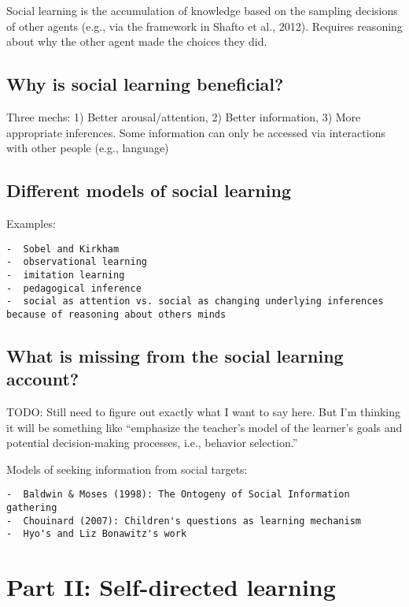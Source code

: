 \documentclass[a4paper,man,apacite,floatsintext]{apa6}
\begin{document}
Social learning is the accumulation of knowledge based on the sampling
decisions of other agents (e.g., via the framework in Shafto et al.,
2012). Requires reasoning about why the other agent made the choices
they did.

\subsection{Why is social learning
beneficial?}\label{why-is-social-learning-beneficial}

Three mechs: 1) Better arousal/attention, 2) Better information, 3) More
appropriate inferences. Some information can only be accessed via
interactions with other people (e.g., language)

\subsection{Different models of social
learning}\label{different-models-of-social-learning}

Examples:

\begin{verbatim}
-  Sobel and Kirkham 
-  observational learning
-  imitation learning
-  pedagogical inference
-  social as attention vs. social as changing underlying inferences because of reasoning about others minds
\end{verbatim}

\subsection{What is missing from the social learning
account?}\label{what-is-missing-from-the-social-learning-account}

TODO: Still need to figure out exactly what I want to say here. But I'm
thinking it will be something like ``emphasize the teacher's model of
the learner's goals and potential decision-making processes, i.e.,
behavior selection.''

Models of seeking information from social targets:

\begin{verbatim}
-  Baldwin & Moses (1998): The Ontogeny of Social Information gathering
-  Chouinard (2007): Children's questions as learning mechanism
-  Hyo's and Liz Bonawitz's work 
\end{verbatim}

\section{Part II: Self-directed
learning}\label{part-ii-self-directed-learning}
\end{document}
